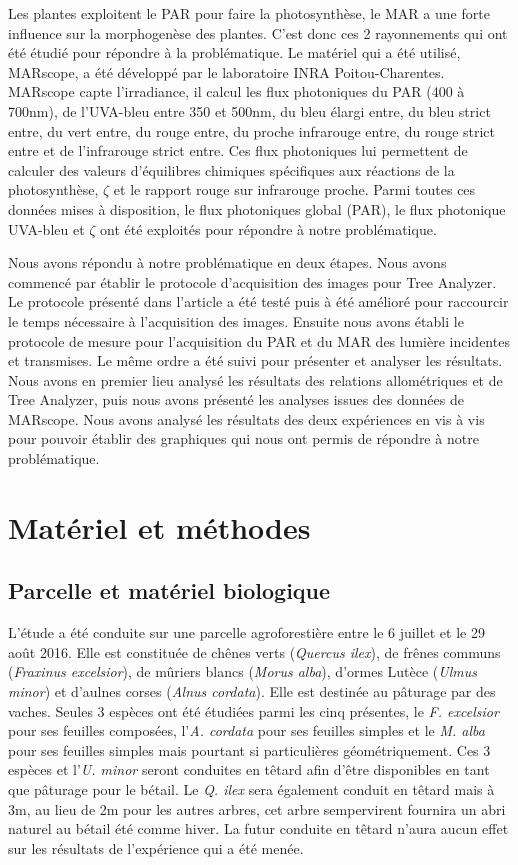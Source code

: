 \documentclass[12pt]{report}
\begin{document}
Les plantes exploitent le PAR pour faire la photosynthèse, le MAR a une forte
influence sur la morphogenèse des plantes. C'est donc ces 2 rayonnements qui
ont été étudié pour répondre à la problématique. Le matériel qui a été utilisé,
MARscope, a été développé par le laboratoire INRA Poitou-Charentes. MARscope
capte l'irradiance, il calcul les flux photoniques
du PAR (400 à 700nm), de l'UVA-bleu entre 350 et 500nm, du bleu élargi entre,
du bleu strict entre, du vert entre, du rouge entre, du proche infrarouge entre,
du rouge strict entre et de l'infrarouge strict entre. Ces flux photoniques
lui permettent de calculer des valeurs d'équilibres chimiques spécifiques aux réactions
de la photosynthèse, $\zeta$ et le rapport rouge sur
infrarouge proche. Parmi toutes ces données mises à disposition, le flux
photoniques global (PAR), le flux photonique UVA-bleu et $\zeta$ ont été
exploités pour répondre à notre problématique.

Nous avons répondu à notre problématique en deux étapes. Nous avons commencé par
établir le protocole d'acquisition des images pour Tree Analyzer. Le protocole
présenté dans l'article \citet{MAR_ref25} a été testé puis à été amélioré pour
raccourcir le temps nécessaire à l'acquisition des images. Ensuite nous avons
établi le protocole de mesure pour l'acquisition du PAR et du MAR des lumière
incidentes et transmises. Le même ordre a été suivi pour présenter et analyser
les résultats. Nous avons en premier lieu analysé les résultats des relations
allométriques et de Tree Analyzer, puis nous avons présenté les analyses issues
des données de MARscope. Nous avons analysé les résultats des deux expériences
en vis à vis pour pouvoir établir des graphiques qui nous ont permis de répondre
à notre problématique.


\chapter{Matériel et méthodes}

\section{Parcelle et matériel biologique}


L'étude a été conduite sur une parcelle agroforestière entre le 6 juillet et le
29 août 2016. Elle est constituée de chênes verts (\textit{Quercus ilex}), de frênes communs
(\textit{Fraxinus excelsior}), de mûriers blancs (\textit{Morus alba}),
d'ormes Lutèce (\textit{Ulmus minor}) et d'aulnes corses
(\textit{Alnus cordata}). Elle est destinée au pâturage par des vaches. Seules 3
espèces ont été étudiées parmi les cinq
présentes, le \textit{F. excelsior} pour ses feuilles composées,
l'\textit{A. cordata} pour ses feuilles simples et le \textit{M. alba} pour ses
feuilles simples mais pourtant si particulières géométriquement. Ces 3 espèces
et l'\textit{U. minor} seront conduites en têtard afin d'être disponibles en
tant que pâturage pour le bétail. Le \textit{Q. ilex} sera également conduit
en têtard mais à 3m, au lieu de 2m pour les autres arbres, cet arbre sempervirent
fournira un abri naturel au bétail été comme hiver. La futur conduite en têtard
n'aura aucun effet sur les résultats de l'expérience qui a été menée.
\end{document}
